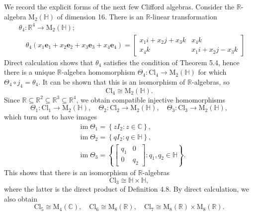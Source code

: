 \documentclass[10pt, letterpaper]{article}
\begin{document}
We record the explicit forms of the next few Clifford algebras. Consider the $\mathbb{R}$-algebra $\mathrm{M}_{2}(\mathbb{H})$ of dimension 16. There is an $\mathbb{R}$-linear transformation
$$
\begin{aligned}
& \theta_{4}: \mathbb{R}^{4} \longrightarrow \mathrm{M}_{2}(\mathbb{H}) ; \\
& \quad \theta_{4}\left(x_{1} \mathbf{e}_{1}+x_{2} \mathbf{e}_{2}+x_{3} \mathbf{e}_{3}+x_{4} \mathbf{e}_{4}\right)=\left[\begin{array}{cc}
x_{1} i+x_{2} j+x_{3} k & x_{4} k \\
x_{4} k & x_{1} i+x_{2} j-x_{3} k
\end{array}\right]
\end{aligned}
$$
Direct calculation shows that $\theta_{4}$ satisfies the condition of Theorem 5.4, hence there is a unique $\mathbb{R}$-algebra homomorphism $\Theta_{4}: \mathrm{Cl}_{4} \rightarrow \mathrm{M}_{2}(\mathbb{H})$ for which $\Theta_{4} \circ j_{4}=\theta_{4}$. It can be shown that this is an isomorphism of $\mathbb{R}$-algebras, so
$$
\mathrm{Cl}_{4} \cong \mathrm{M}_{2}(\mathbb{H}) .
$$
Since $\mathbb{R} \subseteq \mathbb{R}^{2} \subseteq \mathbb{R}^{3} \subseteq \mathbb{R}^{4}$, we obtain compatible injective homomorphisms
$$
\Theta_{1}: \mathrm{Cl}_{1} \longrightarrow \mathrm{M}_{2}(\mathbb{H}), \quad \Theta_{2}: \mathrm{Cl}_{2} \longrightarrow \mathrm{M}_{2}(\mathbb{H}), \quad \Theta_{3}: \mathrm{Cl}_{3} \longrightarrow \mathrm{M}_{2}(\mathbb{H}),
$$
which turn out to have images
$$
\begin{aligned}
& \operatorname{im} \Theta_{1}=\left\{z I_{2}: z \in \mathbb{C}\right\}, \\
& \operatorname{im} \Theta_{2}=\left\{q I_{2}: q \in \mathbb{H}\right\}, \\
& \operatorname{im} \Theta_{3}=\left\{\left[\begin{array}{cc}
q_{1} & 0 \\
0 & q_{2}
\end{array}\right]: q_{1}, q_{2} \in \mathbb{H}\right\} .
\end{aligned}
$$
This shows that there is an isomorphism of $\mathbb{R}$-algebras
$$
\mathrm{Cl}_{3} \cong \mathbb{H} \times \mathbb{H},
$$
where the latter is the direct product of Definition 4.8. By direct calculation, we also obtain
$$
\mathrm{Cl}_{5} \cong \mathrm{M}_{4}(\mathbb{C}), \quad \mathrm{Cl}_{6} \cong \mathrm{M}_{8}(\mathbb{R}), \quad \mathrm{Cl}_{7} \cong \mathrm{M}_{8}(\mathbb{R}) \times \mathrm{M}_{8}(\mathbb{R}) .
$$
\end{document}
